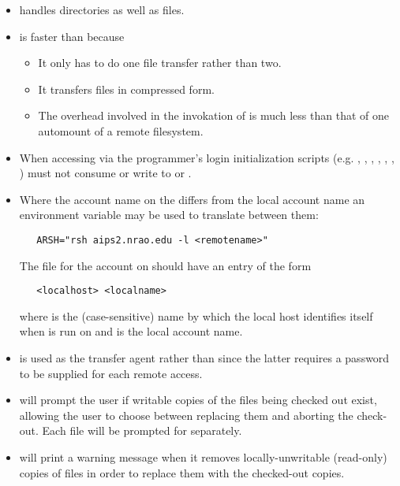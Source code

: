 \begin{itemize}
\item
    handles directories as well as files.
 
\item
    is faster than  because
 
   \begin{itemize}
   \item
      It only has to do one file transfer rather than two.
 
   \item
      It transfers files in compressed form.
 
   \item
      The overhead involved in the invokation of  is much less
      than that of one automount of a remote filesystem.
   \end{itemize}
 
\item
   When accessing  via  the programmer's
   login initialization scripts (e.g. , ,
   , , , , )
   must not consume  or write to  or .
 
\item
   Where the account name on the  differs from the local
   account name an environment variable may be used to translate between them:
 
\begin{verbatim}
   ARSH="rsh aips2.nrao.edu -l <remotename>"
\end{verbatim}
 
   \noindent
   The  file for the  account on
    should have an entry of the form
 
\begin{verbatim}
   <localhost> <localname>
\end{verbatim}
 
   \noindent
   where  is the (case-sensitive) name by which the local
   host identifies itself when  is run on
    and  is the local account name.
 
\item
    is used as the transfer agent rather than  since
   the latter requires a password to be supplied for each remote access.

\item
    will prompt the user if writable copies of the files being
   checked out exist, allowing the user to choose between replacing them
   and aborting the check-out.  Each file will be prompted for
   separately.

\item
    will print a warning message when it removes
   locally-unwritable (read-only) copies of files in order to replace
   them with the checked-out copies.
\end{itemize}
 
